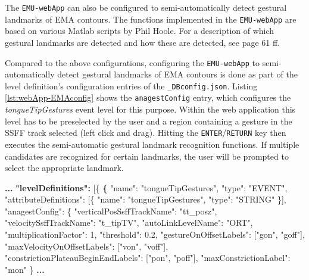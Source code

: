 \documentclass[]{book}
\newenvironment{Shaded}{\begin{snugshade}}{\end{snugshade}}
\newcommand{\DataTypeTok}[1]{\textcolor[rgb]{0.13,0.29,0.53}{#1}}
\newcommand{\DecValTok}[1]{\textcolor[rgb]{0.00,0.00,0.81}{#1}}
\newcommand{\ErrorTok}[1]{\textcolor[rgb]{0.64,0.00,0.00}{\textbf{#1}}}
\newcommand{\FloatTok}[1]{\textcolor[rgb]{0.00,0.00,0.81}{#1}}
\newcommand{\FunctionTok}[1]{\textcolor[rgb]{0.00,0.00,0.00}{#1}}
\newcommand{\OtherTok}[1]{\textcolor[rgb]{0.56,0.35,0.01}{#1}}
\newcommand{\StringTok}[1]{\textcolor[rgb]{0.31,0.60,0.02}{#1}}
\theoremstyle{definition}
\theoremstyle{definition}
\theoremstyle{definition}
\theoremstyle{remark}
\begin{document}
The \texttt{EMU-webApp} can also be configured to semi-automatically
detect gestural landmarks of EMA contours. The functions implemented in
the \texttt{EMU-webApp} are based on various Matlab scripts by Phil
Hoole. For a description of which gestural landmarks are detected and
how these are detected, see \citet{bombien:2011aa} page 61 ff.

Compared to the above configurations, configuring the
\texttt{EMU-webApp} to semi-automatically detect gestural landmarks of
EMA contours is done as part of the level definition's configuration
entries of the \texttt{\_DBconfig.json}. Listing
\ref{lst:webApp-EMAconfig} shows the \texttt{anagestConfig} entry, which
configures the \emph{tongueTipGestures} event level for this purpose.
Within the web application this level has to be preselected by the user
and a region containing a gesture in the SSFF track selected (left click
and drag). Hitting the \texttt{ENTER}/\texttt{RETURN} key then executes
the semi-automatic gestural landmark recognition functions. If multiple
candidates are recognized for certain landmarks, the user will be
prompted to select the appropriate landmark.

\begin{Shaded}
\begin{Highlighting}[]
\ErrorTok{...}
\ErrorTok{"levelDefinitions":} \OtherTok{[}\FunctionTok{\{}
  \ErrorTok{\{}
    \DataTypeTok{"name"}\FunctionTok{:} \StringTok{"tongueTipGestures"}\FunctionTok{,}
    \DataTypeTok{"type"}\FunctionTok{:} \StringTok{"EVENT"}\FunctionTok{,}
    \DataTypeTok{"attributeDefinitions"}\FunctionTok{:} \OtherTok{[}\FunctionTok{\{}
        \DataTypeTok{"name"}\FunctionTok{:} \StringTok{"tongueTipGestures"}\FunctionTok{,}
        \DataTypeTok{"type"}\FunctionTok{:} \StringTok{"STRING"}
    \FunctionTok{\}}\OtherTok{]}\FunctionTok{,}
    \DataTypeTok{"anagestConfig"}\FunctionTok{:} \FunctionTok{\{}
        \DataTypeTok{"verticalPosSsffTrackName"}\FunctionTok{:} \StringTok{"tt_posz"}\FunctionTok{,}
        \DataTypeTok{"velocitySsffTrackName"}\FunctionTok{:} \StringTok{"t_tipTV"}\FunctionTok{,}
        \DataTypeTok{"autoLinkLevelName"}\FunctionTok{:} \StringTok{"ORT"}\FunctionTok{,}
        \DataTypeTok{"multiplicationFactor"}\FunctionTok{:} \DecValTok{1}\FunctionTok{,}
        \DataTypeTok{"threshold"}\FunctionTok{:} \FloatTok{0.2}\FunctionTok{,}
        \DataTypeTok{"gestureOnOffsetLabels"}\FunctionTok{:} \OtherTok{[}\StringTok{"gon"}\OtherTok{,} \StringTok{"goff"}\OtherTok{]}\FunctionTok{,}
        \DataTypeTok{"maxVelocityOnOffsetLabels"}\FunctionTok{:} \OtherTok{[}\StringTok{"von"}\OtherTok{,} \StringTok{"voff"}\OtherTok{]}\FunctionTok{,}
        \DataTypeTok{"constrictionPlateauBeginEndLabels"}\FunctionTok{:} \OtherTok{[}\StringTok{"pon"}\OtherTok{,} \StringTok{"poff"}\OtherTok{]}\FunctionTok{,}
        \DataTypeTok{"maxConstrictionLabel"}\FunctionTok{:} \StringTok{"mon"}
    \FunctionTok{\}}
\ErrorTok{...}
\end{Highlighting}
\end{Shaded}
\end{document}
